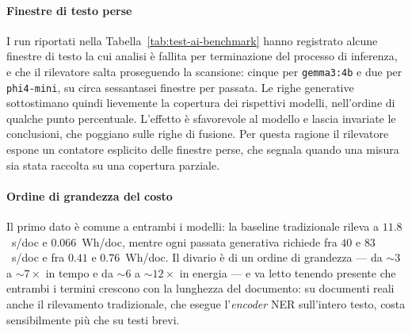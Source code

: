 \paragraph*{Finestre di testo perse} I run riportati nella Tabella~\ref{tab:test-ai-benchmark} hanno registrato alcune finestre di testo la cui analisi è fallita per terminazione del processo di inferenza, e che il rilevatore salta proseguendo la scansione: cinque per \texttt{gemma3:4b} e due per \texttt{phi4-mini}, su circa sessantasei finestre per passata. Le righe generative sottostimano quindi lievemente la copertura dei rispettivi modelli, nell'ordine di qualche punto percentuale. L'effetto è sfavorevole al modello e lascia invariate le conclusioni, che poggiano sulle righe di fusione. Per questa ragione il rilevatore espone un contatore esplicito delle finestre perse, che segnala quando una misura sia stata raccolta su una copertura parziale.

\paragraph*{Ordine di grandezza del costo} Il primo dato è comune a entrambi i modelli: la baseline tradizionale rileva a $11.8$~s/doc e $0.066$~Wh/doc, mentre ogni passata generativa richiede fra $40$ e $83$~s/doc e fra $0.41$ e $0.76$~Wh/doc. Il divario è di un ordine di grandezza --- da ${\sim}3$ a ${\sim}7\times$ in tempo e da ${\sim}6$ a ${\sim}12\times$ in energia --- e va letto tenendo presente che entrambi i termini crescono con la lunghezza del documento: su documenti reali anche il rilevamento tradizionale, che esegue l'\textit{encoder} NER sull'intero testo, costa sensibilmente più che su testi brevi.

